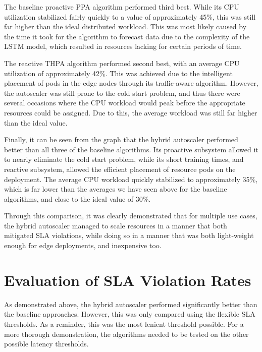 The baseline proactive PPA algorithm performed third best. While its CPU utilization stabilized fairly quickly to a value of approximately 45\%, this was still far higher than the ideal distributed workload. This was most likely caused by the time it took for the algorithm to forecast data due to the complexity of the LSTM model, which resulted in resources lacking for certain periods of time.\par

The reactive THPA algorithm performed second best, with an average CPU utilization of approximately 42\%. This was achieved due to the intelligent placement of pods in the edge nodes through its traffic-aware algorithm. However, the autoscaler was still prone to the cold start problem, and thus there were several occasions where the CPU workload would peak before the appropriate resources could be assigned. Due to this, the average workload was still far higher than the ideal value.\par

Finally, it can be seen from the graph that the hybrid autoscaler performed better than all three of the baseline algorithms. Its proactive subsystem allowed it to nearly eliminate the cold start problem, while its short training times, and reactive subsystem, allowed the efficient placement of resource pods on the deployment. The average CPU workload quickly stabilized to approximately 35\%, which is far lower than the averages we have seen above for the baseline algorithms, and close to the ideal value of 30\%.\par

Through this comparison, it was clearly demonstrated that for multiple use cases, the hybrid autoscaler managed to scale resources in a manner that both mitigated SLA violations, while doing so in a manner that was both light-weight enough for edge deployments, and inexpensive too.\par

\section{Evaluation of SLA Violation Rates}
\label{sec:ch5-sla-violation-eval}

As demonstrated above, the hybrid autoscaler performed significantly better than the baseline approaches. However, this was only compared using the flexible SLA thresholds. As a reminder, this was the most lenient threshold possible. For a more thorough demonstration, the algorithms needed to be tested on the other possible latency thresholds.\par


